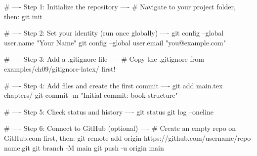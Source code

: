 
# ---- Step 1: Initialize the repository ----
# Navigate to your project folder, then:
git init

# ---- Step 2: Set your identity (run once globally) ----
git config --global user.name "Your Name"
git config --global user.email "you@example.com"

# ---- Step 3: Add a .gitignore file ----
# Copy the .gitignore from examples/ch09/gitignore-latex/ first!

# ---- Step 4: Add files and create the first commit ----
git add main.tex chapters/
git commit -m "Initial commit: book structure"

# ---- Step 5: Check status and history ----
git status
git log --oneline

# ---- Step 6: Connect to GitHub (optional) ----
# Create an empty repo on GitHub.com first, then:
git remote add origin https://github.com/username/repo-name.git
git branch -M main
git push -u origin main
